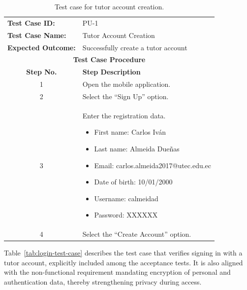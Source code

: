                 \begin{table}[!htbp]
                    \centering
                    \caption{Test case for tutor account creation.}
                    \label{tab:create-tutor-account-test-case}
                    \begin{tabularx}{\textwidth}{l X}
                        \toprule
                        \textbf{Test Case ID:} & PU-1 \\
                        \textbf{Test Case Name:} & Tutor Account Creation \\
                        \textbf{Expected Outcome:} & Successfully create a tutor account \\
                        \midrule
                        \multicolumn{2}{c}{\textbf{Test Case Procedure}} \\
                        \midrule
                        \multicolumn{1}{c}{\textbf{Step No.}} & \textbf{Step Description} \\
                        \midrule
                        \multicolumn{1}{c}{1} & Open the mobile application. \\
                        \multicolumn{1}{c}{2} & Select the ``Sign Up'' option. \\
                        \multicolumn{1}{c}{3} & Enter the registration data.
                        \begin{itemize}
                            \item First name: Carlos Iván
                            \item Last name: Almeida Dueñas
                            \item Email: carlos.almeida2017@utec.edu.ec
                            \item Date of birth: 10/01/2000
                            \item Username: calmeidad
                            \item Password: XXXXXX
                        \end{itemize}\\
                        \multicolumn{1}{c}{4} & Select the ``Create Account'' option. \\
                        \bottomrule
                    \end{tabularx}
                \end{table}
                
                Table~\ref{tab:login-test-case} describes the test case that verifies signing in with a tutor account, explicitly included among the acceptance tests. It is also aligned with the non-functional requirement mandating encryption of personal and authentication data, thereby strengthening privacy during access.
                
